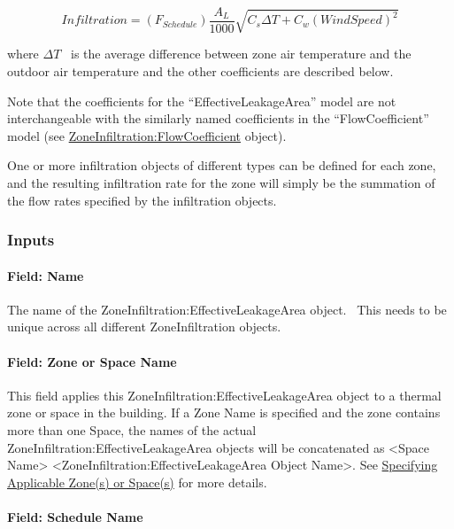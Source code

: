\begin{equation}
Infiltration = \left( {{F_{Schedule}}} \right)\frac{{{A_L}}}{{1000}}\sqrt {{C_s}\Delta T + {C_w}{{\left( {WindSpeed} \right)}^2}}
\end{equation}

where \(\Delta T\) ~is the average difference between zone air temperature and the outdoor air temperature and the other coefficients are described below.

Note that the coefficients for the ``EffectiveLeakageArea'' model are not interchangeable with the similarly named coefficients in the ``FlowCoefficient'' model (see \hyperref[zoneinfiltrationflowcoefficient]{ZoneInfiltration:FlowCoefficient} object).

One or more infiltration objects of different types can be defined for each zone, and the resulting infiltration rate for the zone will simply be the summation of the flow rates specified by the infiltration objects.

\subsubsection{Inputs}\label{inputs-1-005}

\paragraph{Field: Name}\label{field-name-1-004}

The name of the ZoneInfiltration:EffectiveLeakageArea object.~ This needs to be unique across all different ZoneInfiltration objects.

\paragraph{Field: Zone or Space Name}\label{field-zone-name-002}

This field applies this ZoneInfiltration:EffectiveLeakageArea object to a thermal zone or space in the building. If a Zone Name is specified and the zone contains more than one Space, the names of the actual ZoneInfiltration:EffectiveLeakageArea objects will be concatenated as \textless{}Space Name\textgreater{} \textless{}ZoneInfiltration:EffectiveLeakageArea Object Name\textgreater{}. See \hyperref[specifying-applicable-zones-or-spaces]{Specifying Applicable Zone(s) or Space(s)} for more details.

\paragraph{Field: Schedule Name}\label{field-schedule-name-1}

